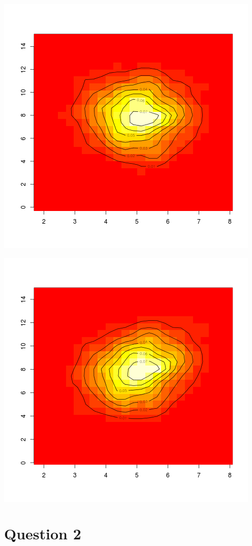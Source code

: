 \documentclass{article}
\begin{document}
\includegraphics{"plot1_2"}
\pagebreak

\includegraphics{"plot1_3"}
\pagebreak

\section{Question 2}
\end{document}
